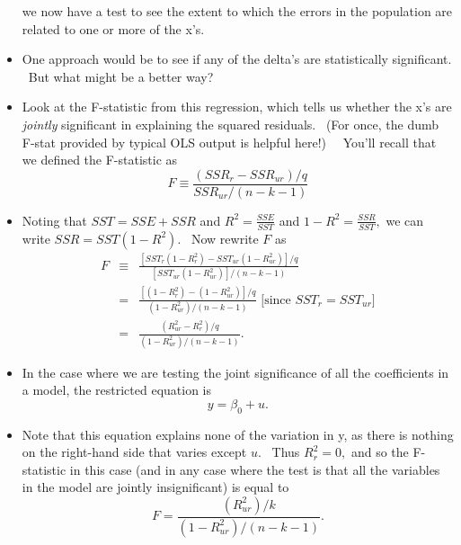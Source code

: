 \documentclass[11pt]{article}
\begin{document}
\begin{itemize}
we now have a test to see the extent to which the errors in the population
are related to one or more of the x's.

\item One approach would be to see if any of the delta's are statistically
significant. \ But what might be a better way?

\item Look at the F-statistic from this regression, which tells us whether
the x's are \textit{jointly }significant in explaining the squared
residuals. \ (For once, the dumb F-stat provided by typical OLS output is
helpful here!) \ \ You'll recall that we defined the F-statistic as 
\begin{equation*}
F\equiv \frac{(SSR_{r}-SSR_{ur})/q}{SSR_{ur}/(n-k-1)}
\end{equation*}

\item Noting that $SST=SSE+SSR$ and $R^{2}=\frac{SSE}{SST}$ and $1-R^{2}=%
\frac{SSR}{SST},$ we can write $SSR=SST\left( 1-R^{2}\right) .$ \ Now
rewrite $F$ as%
\begin{eqnarray*}
F &\equiv &\frac{\left[ SST_{r}\left( 1-R_{r}^{2}\right) -SST_{ur}\left(
1-R_{ur}^{2}\right) \right] /q}{\left[ SST_{ur}\left( 1-R_{ur}^{2}\right) %
\right] /(n-k-1)} \\
&=&\frac{\left[ \left( 1-R_{r}^{2}\right) -\left( 1-R_{ur}^{2}\right) \right]
/q}{\left( 1-R_{ur}^{2}\right) /(n-k-1)}\text{ \ [since }SST_{r}=SST_{ur}%
\text{]} \\
&=&\frac{\left( R_{ur}^{2}-R_{r}^{2}\right) /q}{\left( 1-R_{ur}^{2}\right)
/(n-k-1)}.
\end{eqnarray*}

\item In the case where we are testing the joint significance of all the
coefficients in a model, the restricted equation is%
\begin{equation*}
y=\beta _{0}+u.
\end{equation*}

\item Note that this equation explains none of the variation in y, as there
is nothing on the right-hand side that varies except $u$. \ Thus $%
R_{r}^{2}=0,$ and so the F-statistic in this case (and in any case where the
test is that all the variables in the model are jointly insignificant) is
equal to%
\begin{equation*}
F=\frac{\left( R_{ur}^{2}\right) /k}{\left( 1-R_{ur}^{2}\right) /(n-k-1)}.
\end{equation*}


\end{itemize}
\end{document}
